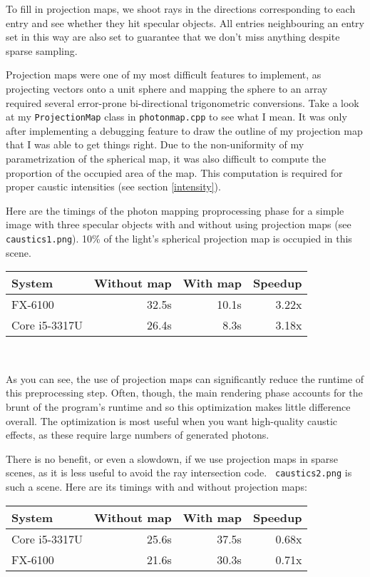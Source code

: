\documentclass{article}
\begin{document}
To fill in projection maps, we shoot rays in the directions corresponding
to each entry and see whether they hit specular objects. All entries
neighbouring an entry set in this way are also set to guarantee that we don't
miss anything despite sparse sampling.

Projection maps were one of my most difficult features to implement, as projecting vectors onto a unit sphere and mapping the sphere to an array required several error-prone bi-directional trigonometric conversions. Take a look at my {\tt ProjectionMap} class in {\tt photonmap.cpp} to see what I mean. It was only after implementing a debugging feature to draw the outline of my projection map that I was able to get things right. Due to the non-uniformity of my parametrization of the spherical map, it was also difficult to compute the proportion of the occupied area of the map. This computation is required for proper caustic intensities (see section \ref{intensity}).

Here are the timings of the photon mapping proprocessing phase for a simple
image with three specular objects with and without using projection maps (see
{\tt caustics1.png}). 10\% of the light's spherical projection map is occupied
in this scene.

\begin{center}
\begin{tabular}{|l|r|r|r|} \hline
 System & Without map & With map & Speedup \\\hline
 FX-6100 & 32.5s & 10.1s & 3.22x \\\hline
 Core i5-3317U & 26.4s & 8.3s & 3.18x \\\hline
\end{tabular} \\
\end{center}

As you can see, the use of projection maps can significantly reduce the runtime
of this preprocessing step. Often, though, the main rendering phase accounts for
the brunt of the program's runtime and so this optimization makes little
difference overall. The optimization is most useful when you want high-quality
caustic effects, as these require large numbers of generated photons.

There is no benefit, or even a slowdown, if we use projection maps in sparse
scenes, as it is less useful to avoid the ray intersection code. {\tt
caustics2.png} is such a scene. Here are its timings with and without projection
maps:

\begin{center}
\begin{tabular}{|l|r|r|r|} \hline
 System & Without map & With map & Speedup \\\hline
 Core i5-3317U & 25.6s & 37.5s & 0.68x \\\hline
       FX-6100 & 21.6s & 30.3s & 0.71x \\\hline
\end{tabular} \\
\end{center}
\end{document}
